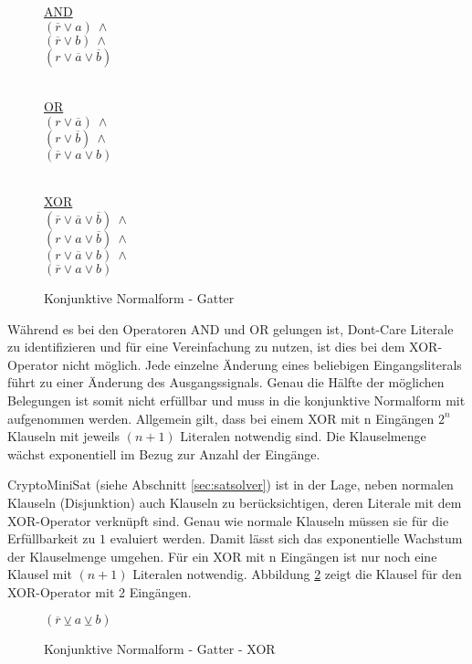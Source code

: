 \begin{figure}[!h]
  \centering
  \begin{minipage}[l]{4.65cm}
    \underline{AND}\\
    $ (\overline{r} \vee a) ~ \wedge $\\
    $ (\overline{r} \vee b) ~ \wedge $\\
    $ (r \vee \overline{a} \vee \overline{b}) $\\
    ~
  \end{minipage}
  \begin{minipage}[l]{4.65cm}
    \underline{OR}\\
    $ (r \vee \overline{a}) ~ \wedge $\\
    $ (r \vee \overline{b}) ~ \wedge $\\
    $ (\overline{r} \vee a \vee b) $\\
    ~
  \end{minipage}
  \begin{minipage}[l]{4.3cm}
    \underline{XOR}\\
    $ (\overline{r} \vee \overline{a} \vee \overline{b}) ~ \wedge $\\
    $ (r \vee a \vee \overline{b}) ~ \wedge $\\
    $ (r \vee \overline{a} \vee b) ~ \wedge $\\
    $ (\overline{r} \vee a \vee b) $
  \end{minipage}
  \caption{Konjunktive Normalform - Gatter}
  \label{fig:gatter_cnf}
\end{figure}

Während es bei den Operatoren AND und OR gelungen ist, Dont-Care Literale zu identifizieren und für eine Vereinfachung zu nutzen, ist dies bei dem XOR-Operator
nicht möglich. Jede einzelne Änderung eines beliebigen Eingangsliterals führt zu einer Änderung des Ausgangssignals. Genau die Hälfte der möglichen Belegungen
ist somit nicht erfüllbar und muss in die konjunktive Normalform mit aufgenommen werden. Allgemein gilt, dass bei einem XOR mit n Eingängen $ 2^{n} $ Klauseln
mit jeweils $ (n + 1) $ Literalen notwendig sind. Die Klauselmenge wächst exponentiell im Bezug zur Anzahl der Eingänge.

CryptoMiniSat (siehe Abschnitt \ref{sec:satsolver}) ist in der Lage, neben normalen Klauseln (Disjunktion) auch Klauseln zu berücksichtigen, deren Literale
mit dem XOR-Operator verknüpft sind. Genau wie normale Klauseln müssen sie für die Erfüllbarkeit zu $1$ evaluiert werden. Damit lässt sich das exponentielle
Wachstum der Klauselmenge umgehen. Für ein XOR mit n Eingängen ist nur noch eine Klausel mit $ (n + 1) $ Literalen notwendig. Abbildung \ref{fig:gatter_cnf_xor}
zeigt die Klausel für den XOR-Operator mit 2 Eingängen.
\begin{figure}[!h]
  \centering
  $ (\overline{r} \veebar a \veebar b) $\\
  \caption{Konjunktive Normalform - Gatter - XOR}
  \label{fig:gatter_cnf_xor}
\end{figure}